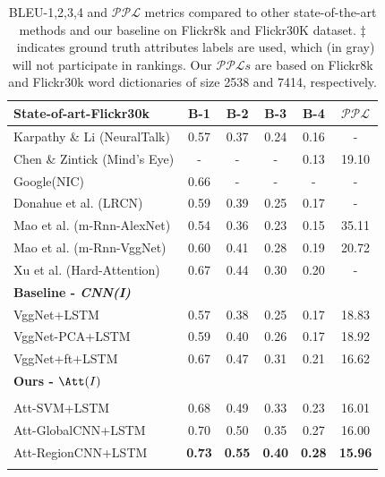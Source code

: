 \begin{table}[t]
\begin{center}
{\begin{tabular}{l c c c c|c }
    \Xhline{2\arrayrulewidth}
    \textbf{State-of-art-Flickr30k} & B-1 & B-2 & B-3 & B-4 & $\mathcal{PPL}$ \\ \hline
    Karpathy \& Li (NeuralTalk) \cite{Karpathy2014deepvs}& 0.57 & 0.37 & 0.24 & 0.16 & - \\
    Chen \& Zintick (Mind's Eye) \cite{Chen2015CVPRMind}& -&-&-&0.13&19.10 \\
    Google(NIC) \cite{vinyals2014show}& 0.66 & - & - &-&- \\
    Donahue et al. (LRCN) \cite{donahue2014long}&0.59&0.39&0.25&0.17&- \\
    Mao et al. (m-Rnn-AlexNet) \cite{mao2014deep}&0.54&0.36&0.23&0.15&35.11 \\
    Mao et al. (m-Rnn-VggNet) \cite{mao2014deep}&0.60&0.41&0.28&0.19&20.72 \\
    Xu et al. (Hard-Attention) \cite{xu2015show}&0.67&0.44&0.30&0.20&- \\
    \Xhline{2\arrayrulewidth}
    \textbf{Baseline - \textit{CNN(I)}} & & & & & \\ \hline
    VggNet+LSTM & 0.57 & 0.38 & 0.25 & 0.17 & 18.83 \\
    VggNet-PCA+LSTM & 0.59 & 0.40 & 0.26 & 0.17 & 18.92 \\
    VggNet+ft+LSTM & 0.67 & 0.47 & 0.31 & 0.21 & 16.62 \\\Xhline{2\arrayrulewidth}
    \textbf{Ours - $\Att(I)$} & & & & & \\ \hline
    \cellcolor[rgb]{0.7,0.7,0.7}{Att-GT+LSTM\textsuperscript{$\ddagger$}} & \cellcolor[rgb]{0.7,0.7,0.7}{0.78} & \cellcolor[rgb]{0.7,0.7,0.7}{0.57} & \cellcolor[rgb]{0.7,0.7,0.7}{0.42} & \cellcolor[rgb]{0.7,0.7,0.7}{0.30} & \cellcolor[rgb]{0.7,0.7,0.7}{14.88} \\
    Att-SVM+LSTM & 0.68 & 0.49 & 0.33 &0.23 & 16.01 \\
    Att-GlobalCNN+LSTM&0.70&0.50&0.35&0.27&16.00\\
    Att-RegionCNN+LSTM & \textbf{0.73} & \textbf{0.55} & \textbf{0.40} & \textbf{0.28} & \textbf{15.96}\\
    \Xhline{2\arrayrulewidth}
  \end{tabular}}
\end{center}
  \vspace{-5pt}
 \caption{BLEU-1,2,3,4 and $\mathcal{PPL}$ metrics compared to other state-of-the-art methods and our baseline on Flickr8k and Flickr30K dataset. $\ddagger$~indicates ground truth attributes labels are used, which (in \colorbox[rgb]{0.7,0.7,0.7}{gray}) will not participate in rankings. Our $\mathcal{PPL}s$ are based on Flickr8k and Flickr30k word dictionaries of size 2538 and 7414, respectively.}
 \vspace{-10pt}
\label{tab1} 
\end{table}

